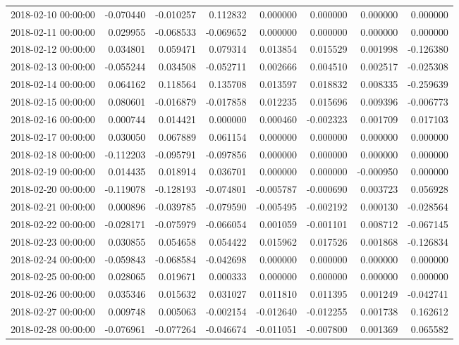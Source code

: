 \begin{tabular}{lrrrrrrr}
2018-02-10 00:00:00 & -0.070440 & -0.010257 & 0.112832 & 0.000000 & 0.000000 & 0.000000 & 0.000000 \\
2018-02-11 00:00:00 & 0.029955 & -0.068533 & -0.069652 & 0.000000 & 0.000000 & 0.000000 & 0.000000 \\
2018-02-12 00:00:00 & 0.034801 & 0.059471 & 0.079314 & 0.013854 & 0.015529 & 0.001998 & -0.126380 \\
2018-02-13 00:00:00 & -0.055244 & 0.034508 & -0.052711 & 0.002666 & 0.004510 & 0.002517 & -0.025308 \\
2018-02-14 00:00:00 & 0.064162 & 0.118564 & 0.135708 & 0.013597 & 0.018832 & 0.008335 & -0.259639 \\
2018-02-15 00:00:00 & 0.080601 & -0.016879 & -0.017858 & 0.012235 & 0.015696 & 0.009396 & -0.006773 \\
2018-02-16 00:00:00 & 0.000744 & 0.014421 & 0.000000 & 0.000460 & -0.002323 & 0.001709 & 0.017103 \\
2018-02-17 00:00:00 & 0.030050 & 0.067889 & 0.061154 & 0.000000 & 0.000000 & 0.000000 & 0.000000 \\
2018-02-18 00:00:00 & -0.112203 & -0.095791 & -0.097856 & 0.000000 & 0.000000 & 0.000000 & 0.000000 \\
2018-02-19 00:00:00 & 0.014435 & 0.018914 & 0.036701 & 0.000000 & 0.000000 & -0.000950 & 0.000000 \\
2018-02-20 00:00:00 & -0.119078 & -0.128193 & -0.074801 & -0.005787 & -0.000690 & 0.003723 & 0.056928 \\
2018-02-21 00:00:00 & 0.000896 & -0.039785 & -0.079590 & -0.005495 & -0.002192 & 0.000130 & -0.028564 \\
2018-02-22 00:00:00 & -0.028171 & -0.075979 & -0.066054 & 0.001059 & -0.001101 & 0.008712 & -0.067145 \\
2018-02-23 00:00:00 & 0.030855 & 0.054658 & 0.054422 & 0.015962 & 0.017526 & 0.001868 & -0.126834 \\
2018-02-24 00:00:00 & -0.059843 & -0.068584 & -0.042698 & 0.000000 & 0.000000 & 0.000000 & 0.000000 \\
2018-02-25 00:00:00 & 0.028065 & 0.019671 & 0.000333 & 0.000000 & 0.000000 & 0.000000 & 0.000000 \\
2018-02-26 00:00:00 & 0.035346 & 0.015632 & 0.031027 & 0.011810 & 0.011395 & 0.001249 & -0.042741 \\
2018-02-27 00:00:00 & 0.009748 & 0.005063 & -0.002154 & -0.012640 & -0.012255 & 0.001738 & 0.162612 \\
2018-02-28 00:00:00 & -0.076961 & -0.077264 & -0.046674 & -0.011051 & -0.007800 & 0.001369 & 0.065582 \\

\end{tabular}
